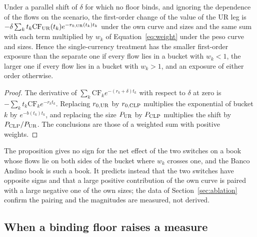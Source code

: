\begin{proposition}
\label{prop:curve}
Under a parallel shift of $\delta$ for which no floor binds, and ignoring the dependence of the flows on the scenario, the first-order change of the value of the UR leg is $-\delta\sum_kt_k\mathrm{CF}_{\mathrm{UR}}(t_k)e^{-r_{0,\mathrm{UR}}(t_k)t_k}$ under the own curve and sizes and the same sum with each term multiplied by $w_k$ of Equation~\eqref{eq:weight} under the peso curve and sizes. Hence the single-currency treatment has the smaller first-order exposure than the separate one if every flow lies in a bucket with $w_k<1$, the larger one if every flow lies in a bucket with $w_k>1$, and an exposure of either order otherwise.
\end{proposition}
\begin{proof}
The derivative of $\sum_k\mathrm{CF}_ke^{-(r_k+\delta)t_k}$ with respect to $\delta$ at zero is $-\sum_kt_k\mathrm{CF}_ke^{-r_kt_k}$. Replacing $r_{0,\mathrm{UR}}$ by $r_{0,\mathrm{CLP}}$ multiplies the exponential of bucket $k$ by $e^{-b(t_k)t_k}$, and replacing the size $P_{\mathrm{UR}}$ by $P_{\mathrm{CLP}}$ multiplies the shift by $P_{\mathrm{CLP}}/P_{\mathrm{UR}}$. The conclusions are those of a weighted sum with positive weights.
\end{proof}

The proposition gives no sign for the net effect of the two switches on a book whose flows lie on both sides of the bucket where $w_k$ crosses one, and the Banco Andino book is such a book. It predicts instead that the two switches have opposite signs and that a large positive contribution of the own curve is paired with a large negative one of the own sizes; the data of Section~\ref{sec:ablation} confirm the pairing and the magnitudes are measured, not derived.

\subsection{When a binding floor raises a measure}
\label{sec:theory-floor}

